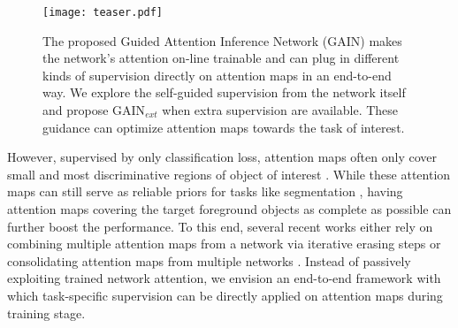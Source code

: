 \documentclass[10pt,twocolumn,letterpaper]{article}
\begin{document}

 \begin{figure}%
 \centering
 \texttt{[image: teaser.pdf]} %
 \caption{The proposed Guided Attention Inference Network (GAIN) makes the network's attention on-line trainable and can plug in different kinds of supervision directly on attention maps in an end-to-end way. We explore the self-guided supervision from the network itself and propose GAIN$_{ext}$ when extra supervision are available. These guidance can optimize attention maps towards the task of interest.}
 \label{fig:teaser}
 \end{figure}

However, supervised by only classification loss, attention maps often only cover small and most discriminative regions of object of interest \cite{kim2017two,singh2017hide,zhou2016learning}. While these attention maps can still serve as reliable priors for tasks like segmentation \cite{kolesnikov2016seed}, having attention maps covering the target foreground objects as complete as possible can further boost the performance. To this end, several recent works either rely on  combining multiple attention maps from a network via iterative erasing steps \cite{wei2017object} or consolidating attention maps from multiple networks \cite{kim2017two}. Instead of passively exploiting trained network attention, we envision an end-to-end framework with which task-specific supervision can be directly applied on attention maps during training stage.

\end{document}
